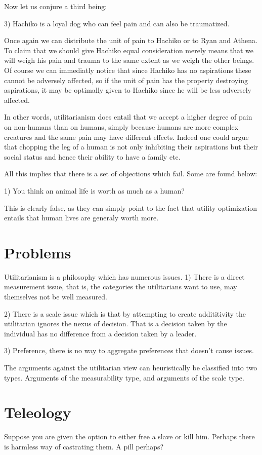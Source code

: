 Now let us conjure a third being: 

3) Hachiko is a loyal dog who can feel pain and can also be traumatized. 

Once again we can distribute the unit of pain to Hachiko or to Ryan and Athena. To claim that we should give Hachiko equal consideration merely means that we will weigh his pain and trauma to the same extent as we weigh the other beings. Of course we can immediatly notice that since Hachiko has no aspirations these cannot be adversely affected, so if the unit of pain has the property destroying aspirations, it may be optimally given to Hachiko since he will be less adversely affected. 

In other words, utilitarianism does entail that we accept a higher degree of pain on non-humans than on humans, simply because humans are more complex creatures and the same pain may have different effects. Indeed one could argue that chopping the leg of a human is not only inhibiting their aspirations but their social status and hence their ability to have a family etc. 

All this implies that there is a set of objections which fail. Some are found below:

1) You think an animal life is worth as much as a human? 

This is clearly false, as they can simply point to the fact that utility optimization entails that human lives are generaly worth more. 

\section{Problems}

Utilitarianism is a philosophy which has numerous issues. 
1) There is a direct measurement issue, that is, the categories the utilitarians want to use, may themselves not be well measured. 

2) There is a scale issue which is that by attempting to create addititivity the utilitarian ignores the nexus of decision. That is a decision taken by the individual has no difference from a decision taken by a leader. 

3) Preference, there is no way to aggregate preferences that doesn't cause issues. 

The arguments against the utilitarian view can heuristically be classified into two types. Arguments of the measurability type, and arguments of the scale type. 

\section{Teleology}
Suppose you are given the option to either free a slave or kill him. Perhaps there is harmless way of castrating them. A pill perhaps? 

